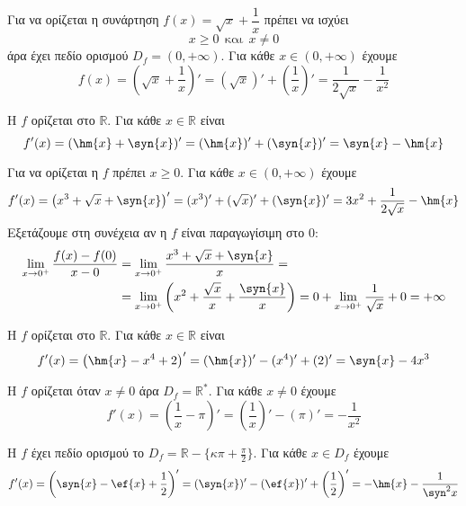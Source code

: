 \begin{alist}
\item Για να ορίζεται η συνάρτηση $ f(x)=\sqrt{x}+\dfrac{1}{x} $ πρέπει να ισχύει
\[ x\geq 0\ \ \text{και}\ \ x\neq 0 \]
άρα έχει πεδίο ορισμού $ D_f=(0,+\infty) $. Για κάθε $ x\in(0,+\infty) $ έχουμε
\[ f(x)=\left(\sqrt{x}+\dfrac{1}{x}\right)'=(\sqrt{x})'+\left(\frac{1}{x}\right)'=\frac{1}{2\sqrt{x}}-\frac{1}{x^2} \]
\item Η $ f $ ορίζεται στο $ \mathbb{R} $. Για κάθε $ x\in\mathbb{R} $ είναι
\[ f'(x)=(\hm{x}+\syn{x})'=(\hm{x})'+(\syn{x})'=\syn{x}-\hm{x} \]
\item Για να ορίζεται η $ f $ πρέπει $ x\geq 0 $. Για κάθε $ x\in(0,+\infty) $ έχουμε
\[ f'(x)=\left(x^3+\sqrt{x}+\syn{x}\right)'=(x^3)'+(\sqrt{x})'+(\syn{x})'=3x^2+\frac{1}{2\sqrt{x}}-\hm{x} \]
Εξετάζουμε στη συνέχεια αν η $ f $ είναι παραγωγίσιμη στο $ 0 $:
\begin{align*}
\lim_{x\to 0^+}{\frac{f(x)-f(0)}{x-0}}&=\lim_{x\to 0^+}{\frac{x^3+\sqrt{x}+\syn{x}}{x}}=\\
&=\lim_{x\to 0^+}{\left(x^2+
\frac{\sqrt{x}}{x}+\frac{\syn{x}}{x}\right)}=0+\lim_{x\to 0^+}{\frac{1}{\sqrt{x}}}+0=+\infty
\end{align*}
\item Η $ f $ ορίζεται στο $ \mathbb{R} $. Για κάθε $ x\in\mathbb{R} $ είναι
\[ f'(x)=\left(\hm{x}-x^4+2\right)'=(\hm{x})'-(x^4)'+(2)'=\syn{x}-4x^3 \]
\item Η $ f $ ορίζεται όταν $ x\neq 0 $ άρα $ D_f=\mathbb{R}^* $. Για κάθε $ x\neq 0 $ έχουμε
\[ f'(x)=\left(\frac{1}{x}-\pi\right)'=\left(\frac{1}{x}\right)'-(\pi)'=-\frac{1}{x^2} \]
\item Η $ f $ έχει πεδίο ορισμού το $ D_f=\mathbb{R}-\{\kappa\pi+\frac{\pi}{2}\} $. Για κάθε $ x\in D_f $ έχουμε
\[ f'(x)=\left(\syn{x}-\ef{x}+\frac{1}{2}\right)'=(\syn{x})'-(\ef{x})'+\left(\frac{1}{2}\right)'=-\hm{x}-\frac{1}{\syn^2{x}} \]
\end{alist}
